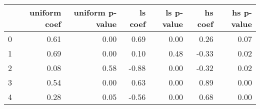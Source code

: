 \begin{tabular}{lrrrrrr}
\toprule
 & uniform coef & uniform p-value & ls coef & ls p-value & hs coef & hs p-value \\
\midrule
0 & 0.61 & 0.00 & 0.69 & 0.00 & 0.26 & 0.07 \\
1 & 0.69 & 0.00 & 0.10 & 0.48 & -0.33 & 0.02 \\
2 & 0.08 & 0.58 & -0.88 & 0.00 & -0.32 & 0.02 \\
3 & 0.54 & 0.00 & 0.63 & 0.00 & 0.89 & 0.00 \\
4 & 0.28 & 0.05 & -0.56 & 0.00 & 0.68 & 0.00 \\
\bottomrule
\end{tabular}
